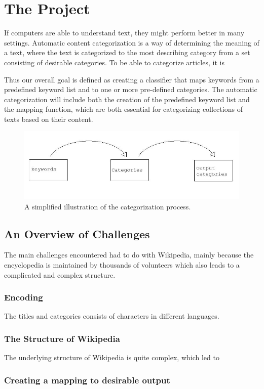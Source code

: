 \section{The Project}
If computers are able to understand text, they might perform better in many settings. Automatic content categorization is a way of determining the meaning of a text, where the text is categorized to the most describing category from a set consisting of desirable categories.
To be able to categorize articles, it is 

Thus our overall goal is defined as creating a classifier that maps keywords from a predefined keyword list and to one or more pre-defined categories. The automatic categorization will include both the creation of the predefined keyword list and the mapping function, which are both essential for categorizing collections of texts based on their content. 

\begin{figure}[H]
\centering
\includegraphics[width=1\textwidth]{Chapters/Introduction/classification_process.jpeg}
\caption{A simplified illustration of the categorization process.}
\label{fig:classification_process}
\end{figure}

\subsection{An Overview of Challenges}
The main challenges encountered had to do with Wikipedia, mainly because the encyclopedia is maintained by thousands of volunteers which also leads to a complicated and complex structure. 

\subsubsection{Encoding}
The titles and categories consists of characters in different languages. 


\subsubsection{The Structure of Wikipedia}
The underlying structure of Wikipedia is quite complex, which led to 

\subsubsection{Creating a mapping to desirable output}
